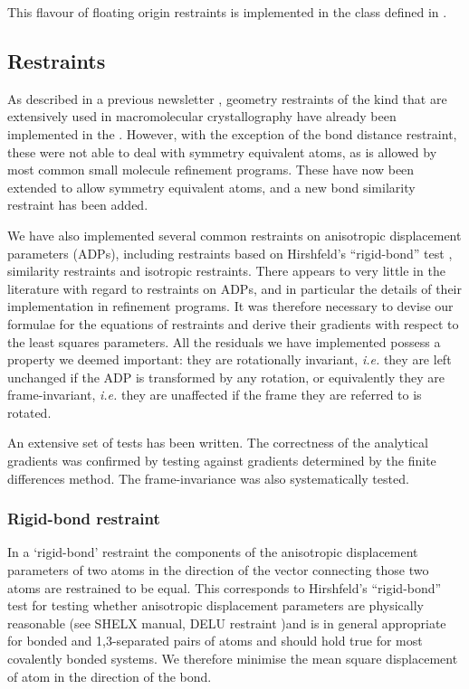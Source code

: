 \documentclass[12pt]{article}
\begin{document}
This flavour of floating origin restraints is implemented in the \cpp class  defined in .
\subsection{Restraints}

As described in a previous \cctbx newsletter \cite{cctbxnews:2004b}, geometry restraints of the kind that are extensively used in macromolecular crystallography have already been implemented in the \cctbx.  However, with the exception of the bond distance restraint, these were not able to deal with symmetry equivalent atoms, as is allowed by most common small molecule refinement programs.  These have now been extended to allow symmetry equivalent atoms, and a new bond similarity restraint has been added.

We have also implemented several common restraints on anisotropic displacement parameters (ADPs), including restraints based on Hirshfeld's ``rigid-bond'' test \cite{Hirshfeld:1976}, similarity restraints and isotropic restraints.
There appears to very little in the literature with regard to restraints on ADPs, and in particular the details of their implementation in refinement programs. It was therefore necessary to devise our formulae for the equations of restraints and derive their gradients with respect to the least squares parameters. All the residuals we have implemented possess a property we deemed important: they are rotationally invariant, \emph{i.e.} they are left unchanged if the ADP is transformed by any rotation, or equivalently they are frame-invariant, \emph{i.e.} they are unaffected if the frame they are referred to is rotated.

An extensive set of tests has been written. The correctness of the analytical gradients was confirmed by testing against gradients determined by the finite differences method. The frame-invariance was also systematically tested.

\subsubsection{Rigid-bond restraint}

In a `rigid-bond' restraint the components of the anisotropic displacement parameters of two atoms in the direction of the vector connecting those two atoms are restrained to be equal. This corresponds to Hirshfeld's ``rigid-bond'' test \cite{Hirshfeld:1976} for testing whether anisotropic displacement parameters are physically reasonable (see SHELX manual, DELU restraint \cite{SHELX:man97})and is in general appropriate for bonded and 1,3-separated pairs of atoms and should hold true for most covalently bonded systems. We therefore minimise the mean square displacement of atom in the direction of the bond.
\end{document}

